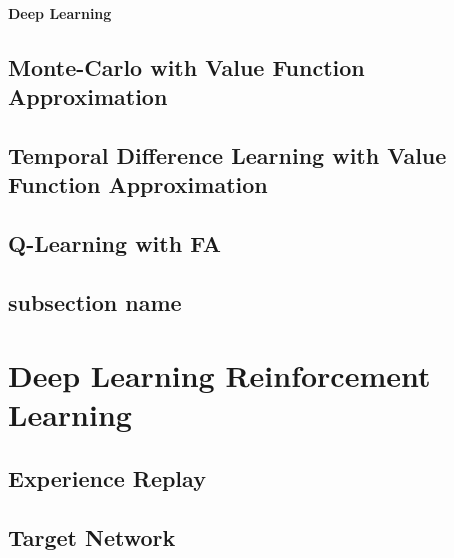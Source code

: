 		\paragraph*{Deep Learning}

	\subsection{Monte-Carlo with Value Function Approximation} %
		\label{sub:monte_carlo_with_value_function_approximation}
	
	
	\subsection{Temporal Difference Learning with Value Function Approximation} %
	\label{sub:temporal_difference_learning_with_value_function_approximation}

	
	\subsection{Q-Learning with FA} %
	\label{sub:q_learning_with_fa}
	
	
	\subsection{subsection name} %
	\label{sub:subsection_name}
	

\section{Deep Learning Reinforcement Learning} %
	\label{sec:deep_learning_reinforcement_learning}

	\subsection{Experience Replay} %
		\label{sub:experience_replay}
	
	\subsection{Target Network} %
		\label{sub:target_network}
	
